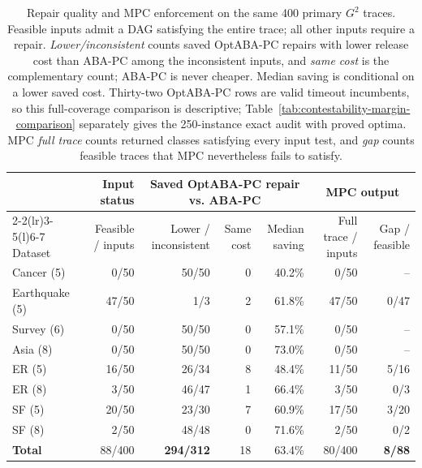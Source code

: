 \begin{table}[t]
\centering
\small
\begin{tabular}{@{}lrrrrrr@{}}
\toprule
& Input status & \multicolumn{3}{c}{Saved OptABA-PC repair vs. ABA-PC} & \multicolumn{2}{c}{MPC output} \\
\cmidrule(lr){2-2}\cmidrule(lr){3-5}\cmidrule(l){6-7}
Dataset & Feasible / inputs & Lower / inconsistent & Same cost & Median saving & Full trace / inputs & Gap / feasible \\
\midrule
Cancer (5) & 0/50 & 50/50 & 0 & 40.2\% & 0/50 & -- \\
Earthquake (5) & 47/50 & 1/3 & 2 & 61.8\% & 47/50 & 0/47 \\
Survey (6) & 0/50 & 50/50 & 0 & 57.1\% & 0/50 & -- \\
Asia (8) & 0/50 & 50/50 & 0 & 73.0\% & 0/50 & -- \\
ER (5) & 16/50 & 26/34 & 8 & 48.4\% & 11/50 & 5/16 \\
ER (8) & 3/50 & 46/47 & 1 & 66.4\% & 3/50 & 0/3 \\
SF (5) & 20/50 & 23/30 & 7 & 60.9\% & 17/50 & 3/20 \\
SF (8) & 2/50 & 48/48 & 0 & 71.6\% & 2/50 & 0/2 \\
\midrule
\textbf{Total} & 88/400 & \textbf{294/312} & 18 & 63.4\% & 80/400 & \textbf{8/88} \\
\bottomrule
\end{tabular}
\caption{Repair quality and MPC enforcement on the same 400 primary $G^2$ traces. Feasible inputs admit a DAG satisfying the entire trace; all other inputs require a repair. \emph{Lower/inconsistent} counts saved OptABA-PC repairs with lower release cost than ABA-PC among the inconsistent inputs, and \emph{same cost} is the complementary count; ABA-PC is never cheaper. Median saving is conditional on a lower saved cost. Thirty-two OptABA-PC rows are valid timeout incumbents, so this full-coverage comparison is descriptive; Table~\ref{tab:contestability-margin-comparison} separately gives the 250-instance exact audit with proved optima. MPC \emph{full trace} counts returned classes satisfying every input test, and \emph{gap} counts feasible traces that MPC nevertheless fails to satisfy.}
\label{tab:primary-repair-enforcement}
\label{tab:abapc-optimality-by-dataset}
\label{tab:mpc-enforcement-gap}
\end{table}

